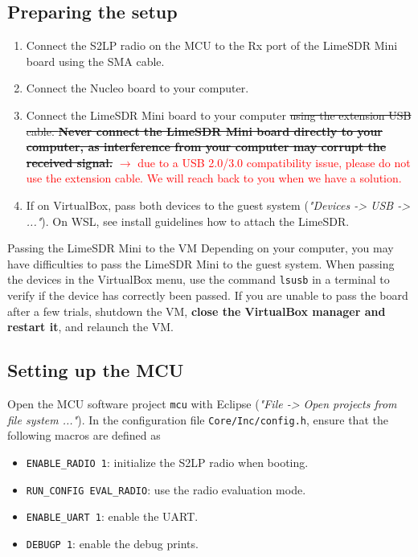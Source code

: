 \subsection{Preparing the setup}

\begin{enumerate}
    \item Connect the S2LP radio on the MCU to the Rx port of the LimeSDR Mini board using the SMA cable.
    \item Connect the Nucleo board to your computer.
    \item Connect the LimeSDR Mini board to your computer \st{using the extension USB cable.
        \textbf{Never connect the LimeSDR Mini board directly to your computer, as interference from your computer may corrupt the received signal.}} \textcolor{red}{$\rightarrow$ due to a USB 2.0/3.0 compatibility issue, please do not use the extension cable. We will reach back to you when we have a solution.}
    \item If on VirtualBox, pass both devices to the guest system (\textit{"Devices -> USB -> ..."}). On WSL, see install guidelines how to attach the LimeSDR.
\end{enumerate}

\begin{bclogo}[couleur = gray!20, arrondi = 0.2, logo=\bcinfo]{Passing the LimeSDR Mini to the VM}
    Depending on your computer, you may have difficulties to pass the LimeSDR Mini to the guest system.
    When passing the devices in the VirtualBox menu, use the command \texttt{lsusb} in a terminal to verify if the device has correctly been passed.
    If you are unable to pass the board after a few trials, shutdown the VM, \textbf{close the VirtualBox manager and restart it}, and relaunch the VM.
\end{bclogo}

\subsection{Setting up the MCU}

Open the MCU software project \texttt{mcu} with Eclipse (\textit{"File -> Open projects from file system ..."}).
In the configuration file \texttt{Core/Inc/config.h}, ensure that the following macros are defined as
\begin{itemize}
    \item \texttt{ENABLE\_RADIO 1}: initialize the S2LP radio when booting.
    \item \texttt{RUN\_CONFIG EVAL\_RADIO}: use the radio evaluation mode.
    \item \texttt{ENABLE\_UART 1}: enable the UART.
    \item \texttt{DEBUGP 1}: enable the debug prints.
\end{itemize}

